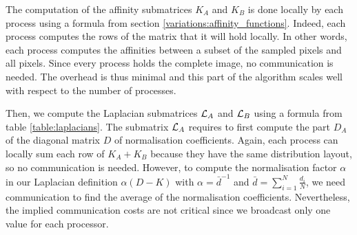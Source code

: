 The computation of the affinity submatrices \(K_A\) and \(K_B\) is done locally by each process using a formula from section \ref{variations:affinity_functions}.
Indeed, each process computes the rows of the matrix that it will hold locally.
In other words, each process computes the affinities between a subset of the sampled pixels and all pixels.
Since every process holds the complete image, no communication is needed.
The overhead is thus minimal and this part of the algorithm scales well with respect to the number of processes.

Then, we compute the Laplacian submatrices \(\operatorname{\mathcal{L}}_A\) and \(\operatorname{\mathcal{L}}_B\) using a formula from table \ref{table:laplacians}.
The submatrix \(\operatorname{\mathcal{L}}_A\) requires to first compute the part \(D_A\) of the diagonal matrix \(D\) of normalisation coefficients.
Again, each process can locally sum each row of \(K_A + K_B\) because they have the same distribution layout, so no communication is needed.
However, to compute the normalisation factor \(\alpha\) in our Laplacian definition \(\alpha (D - K)\) with \(\alpha = \bar{d}^{-1}\) and \(\bar{d} = \sum^N_{i=1} \frac{d_i}{N}\), we need communication to find the average of the normalisation coefficients.
Nevertheless, the implied communication costs are not critical since we broadcast only one value for each processor.
